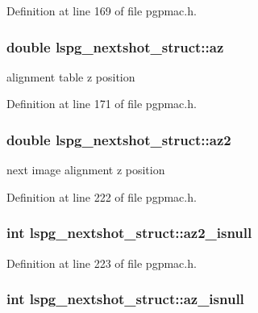 Definition at line 169 of file pgpmac.h.\hypertarget{structlspg__nextshot__struct_a66e678866ce79f6398b66d033ae45a17}{
\subsubsection[{az}]{\setlength{\rightskip}{0pt plus 5cm}double {\bf lspg\_\-nextshot\_\-struct::az}}}
\label{structlspg__nextshot__struct_a66e678866ce79f6398b66d033ae45a17}


alignment table z position 

Definition at line 171 of file pgpmac.h.\hypertarget{structlspg__nextshot__struct_a94698a030fd5b2abf1f10a2ad33476a4}{
\subsubsection[{az2}]{\setlength{\rightskip}{0pt plus 5cm}double {\bf lspg\_\-nextshot\_\-struct::az2}}}
\label{structlspg__nextshot__struct_a94698a030fd5b2abf1f10a2ad33476a4}


next image alignment z position 

Definition at line 222 of file pgpmac.h.\hypertarget{structlspg__nextshot__struct_a95d080f13a4e02b9aa883821ee3e721c}{
\subsubsection[{az2\_\-isnull}]{\setlength{\rightskip}{0pt plus 5cm}int {\bf lspg\_\-nextshot\_\-struct::az2\_\-isnull}}}
\label{structlspg__nextshot__struct_a95d080f13a4e02b9aa883821ee3e721c}


Definition at line 223 of file pgpmac.h.\hypertarget{structlspg__nextshot__struct_aaebd6d432810313294b5fed5f4445cb1}{
\subsubsection[{az\_\-isnull}]{\setlength{\rightskip}{0pt plus 5cm}int {\bf lspg\_\-nextshot\_\-struct::az\_\-isnull}}}
\label{structlspg__nextshot__struct_aaebd6d432810313294b5fed5f4445cb1}


